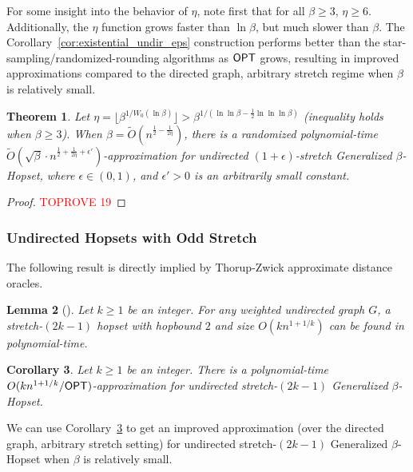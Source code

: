 \documentclass{article}
\newtheorem{theorem}{Theorem}[section]
\newtheorem{corollary}[theorem]{Corollary}
\newtheorem{lemma}[theorem]{Lemma}
\theoremstyle{definition}
\theoremstyle{remark}
\def\be    {\beta}
\def\opt {{\sf OPT}}
\def\hopset {{\sc Generalized $\beta$-Hopset}}
\begin{document}
For some insight into the behavior of $\eta$, note first that for all $\beta \geq 3$, $\eta \geq 6$. Additionally, the $\eta$ function grows faster than $\ln{\be}$, but much slower than $\be$. The Corollary~\ref{cor:existential_undir_eps} construction performs better than the star-sampling/randomized-rounding algorithms as $\opt$ grows, resulting in improved approximations compared to the directed graph, arbitrary stretch regime when $\be$ is relatively small. 


\begin{theorem} \label{thm:undir_eps}    
    Let $\eta = \lfloor \beta^{1/W_0(\ln{\beta})} \rfloor > \be^{1/(\ln{\ln{\be}}-\frac{1}{2}\ln{\ln{\ln{\be}}})}$ (inequality holds when $\be \geq 3$). When $\beta = \widetilde{O}(n^{\frac{1}{2} - \frac{1}{2\eta}})$, there is a randomized polynomial-time $\widetilde{O}(\sqrt{\be} \cdot n^{\frac{1}{2} + \frac{1}{2\eta} + \epsilon'})$-approximation for undirected $(1+\epsilon)$-stretch {\hopset}, where $\epsilon \in (0,1)$, and $\epsilon' > 0$ is an arbitrarily small constant.
\end{theorem}
\begin{proof}\textcolor{red}{TOPROVE 19}\end{proof}



\subsubsection{Undirected Hopsets with Odd Stretch}

The following result is directly implied by Thorup-Zwick approximate distance oracles.

\begin{lemma}[\hspace{1sp}\cite{TZ05}]
    Let $k \geq 1$ be an integer. For any weighted undirected graph $G$, a stretch-$(2k-1)$ hopset with hopbound $2$ and size $O(kn^{1+1/k})$ can be found in polynomial-time.
\end{lemma}
\begin{corollary} \label{cor:existential_undir_k}
    Let $k \geq 1$ be an integer. There is a polynomial-time $O(kn^{1+1/k} / {\opt})$-approximation for undirected stretch-$(2k-1)$ {\hopset}.
\end{corollary}

We can use Corollary~\ref{cor:existential_undir_k} to get an improved approximation (over the directed graph, arbitrary stretch setting) for undirected stretch-$(2k-1)$ {\hopset} when $\be$ is relatively small.
\end{document}
